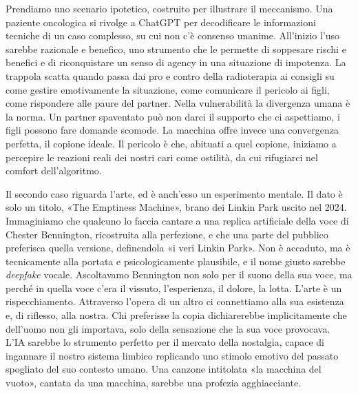 
Prendiamo uno scenario ipotetico, costruito per illustrare il meccanismo. Una paziente oncologica si rivolge a ChatGPT per decodificare le informazioni tecniche di un caso complesso, su cui non c'è consenso unanime. All'inizio l'uso sarebbe razionale e benefico, uno strumento che le permette di soppesare rischi e benefici e di riconquistare un senso di agency in una situazione di impotenza. La trappola scatta quando passa dai pro e contro della radioterapia ai consigli su come gestire emotivamente la situazione, come comunicare il pericolo ai figli, come rispondere alle paure del partner. Nella vulnerabilità la divergenza umana è la norma. Un partner spaventato può non darci il supporto che ci aspettiamo, i figli possono fare domande scomode. La macchina offre invece una convergenza perfetta, il copione ideale. Il pericolo è che, abituati a quel copione, iniziamo a percepire le reazioni reali dei nostri cari come ostilità, da cui rifugiarci nel comfort dell'algoritmo.

Il secondo caso riguarda l'arte, ed è anch'esso un esperimento mentale. Il dato è solo un titolo, «The Emptiness Machine», brano dei Linkin Park uscito nel 2024. Immaginiamo che qualcuno lo faccia cantare a una replica artificiale della voce di Chester Bennington, ricostruita alla perfezione, e che una parte del pubblico preferisca quella versione, definendola «i veri Linkin Park». Non è accaduto, ma è tecnicamente alla portata e psicologicamente plausibile, e il nome giusto sarebbe \textit{deepfake} vocale. Ascoltavamo Bennington non solo per il suono della sua voce, ma perché in quella voce c'era il vissuto, l'esperienza, il dolore, la lotta. L'arte è un rispecchiamento. Attraverso l'opera di un altro ci connettiamo alla sua esistenza e, di riflesso, alla nostra. Chi preferisse la copia dichiarerebbe implicitamente che dell'uomo non gli importava, solo della sensazione che la sua voce provocava. L'IA sarebbe lo strumento perfetto per il mercato della nostalgia, capace di ingannare il nostro sistema limbico replicando uno stimolo emotivo del passato spogliato del suo contesto umano. Una canzone intitolata «la macchina del vuoto», cantata da una macchina, sarebbe una profezia agghiacciante.

